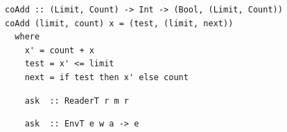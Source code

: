 \documentclass{beamer}
\begin{document}

\begin{frame}[fragile]
  \begin{verbatim}
coAdd :: (Limit, Count) -> Int -> (Bool, (Limit, Count))
coAdd (limit, count) x = (test, (limit, next))
  where
    x' = count + x
    test = x' <= limit
    next = if test then x' else count
  \end{verbatim}
\end{frame}

\begin{frame}[fragile]
  \begin{overprint}
  \begin{verbatim}
    ask  :: ReaderT r m r
  \end{verbatim}
  \begin{verbatim}
    ask  :: EnvT e w a -> e
  \end{verbatim}
  \end{overprint}
\end{frame}
\end{document}
